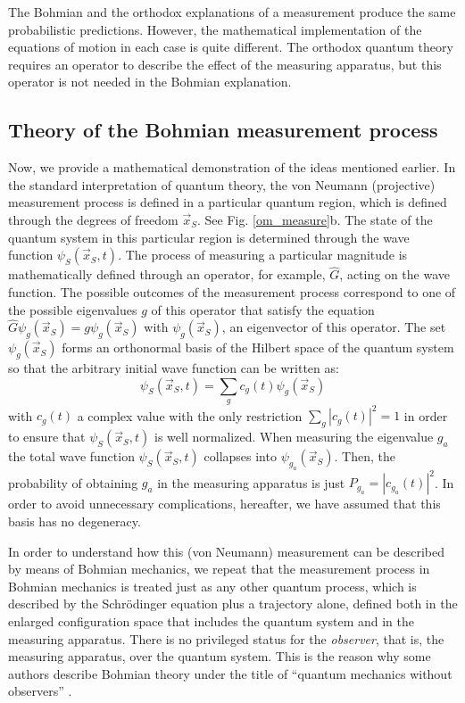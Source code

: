 \documentclass[onecolumn,nofootinbib, secnumarabic, amsmath, nobibnotes,12pt,aps,pra]{revtex4-1}
\newcommand{\fref}[1]{Fig. \ref{#1}}
\begin{document}
The Bohmian and the orthodox explanations of a measurement produce the same probabilistic predictions. However, the mathematical implementation of the equations of motion in each case is quite different. The orthodox quantum theory requires an operator to describe the effect of the measuring apparatus, but this operator is not needed in the Bohmian explanation.

\subsection{Theory of the Bohmian measurement process}
\label{om.sec_measurement.1}

Now, we provide a mathematical demonstration of the ideas mentioned
earlier. In the standard interpretation of quantum theory, the von
Neumann (projective) measurement process is defined in a particular
quantum region, which is defined through the degrees of freedom
$\vec x_S$. See \fref{om_measure}b. The state of the quantum system
in this particular region is determined through the wave function
$\psi_S(\vec x_S,t)$. The process of measuring a particular
magnitude is mathematically defined through an operator, for
example, $\hat{G}$, acting on the wave function. The possible
outcomes of the measurement process correspond to one of the
possible eigenvalues $g$ of this operator that satisfy the equation
$\hat{G}\psi_g(\vec x_S) = g\psi_g(\vec x_S)$ with $\psi_g(\vec
x_S)$, an eigenvector of this operator. The set $\psi_g(\vec x_S)$
forms an orthonormal basis of the Hilbert space of the quantum
system so that the arbitrary initial wave function can be written
as:\enlargethispage{1pc}
\begin{equation}
\label{om.bmeasure1}
\psi_S(\vec x_S,t) = \sum_{g} c_g(t)\psi_g(\vec x_S)
\end{equation}
with $c_g(t)$ a complex value with the only restriction $\sum_{g}
|c_g(t)|^2 = 1$ in order to ensure that $\psi_S(\vec x_S,t)$ is well
normalized. When measuring the eigenvalue $g_a$ the total wave
function $\psi_S(\vec x_S,t)$ collapses into $\psi_{g_a}(\vec x_S)$.
Then, the probability of obtaining $g_a$ in the measuring apparatus
is just $P_{g_a} = |c_{g_a}(t)|^2$. In order to avoid unnecessary
complications, hereafter, we have assumed that this basis has no
degeneracy.

In order to understand how this (von Neumann) measurement can be
described by means of Bohmian mechanics, we repeat that the
measurement process in Bohmian mechanics is treated just as any
other quantum process, which is described by the Schr\"odinger
equation plus a trajectory alone, defined both in the enlarged
configuration space that includes the quantum system and in the
measuring apparatus. There is no privileged status for the
\emph{observer}, that is, the measuring apparatus, over the quantum
system. This is the reason why some authors describe Bohmian theory
under the title of ``quantum mechanics without observers''
\cite{om.Goldsteinobserver}.
\end{document}
